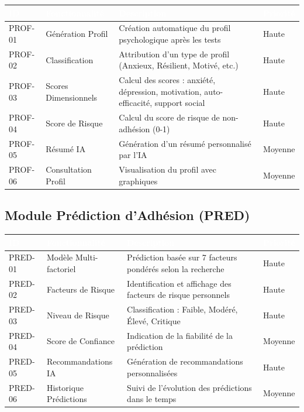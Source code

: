 \documentclass[12pt,a4paper]{report}
\begin{document}
\begin{longtable}{|p{2cm}|p{4cm}|p{7cm}|p{1.5cm}|}
    \hline
    \rowcolor{emsiblue}\textcolor{white}{\textbf{ID}} & \textcolor{white}{\textbf{Fonctionnalité}} & \textcolor{white}{\textbf{Description}} & \textcolor{white}{\textbf{Priorité}} \\
    \hline
    
    PROF-01 & Génération Profil & Création automatique du profil psychologique après les tests & Haute \\
    \hline
    PROF-02 & Classification & Attribution d'un type de profil (Anxieux, Résilient, Motivé, etc.) & Haute \\
    \hline
    PROF-03 & Scores Dimensionnels & Calcul des scores : anxiété, dépression, motivation, auto-efficacité, support social & Haute \\
    \hline
    PROF-04 & Score de Risque & Calcul du score de risque de non-adhésion (0-1) & Haute \\
    \hline
    PROF-05 & Résumé IA & Génération d'un résumé personnalisé par l'IA & Moyenne \\
    \hline
    PROF-06 & Consultation Profil & Visualisation du profil avec graphiques & Moyenne \\
    \hline
\end{longtable}

\subsection{Module Prédiction d'Adhésion (PRED)}

\begin{longtable}{|p{2cm}|p{4cm}|p{7cm}|p{1.5cm}|}
    \hline
    \rowcolor{emsiblue}\textcolor{white}{\textbf{ID}} & \textcolor{white}{\textbf{Fonctionnalité}} & \textcolor{white}{\textbf{Description}} & \textcolor{white}{\textbf{Priorité}} \\
    \hline
    
    PRED-01 & Modèle Multi-factoriel & Prédiction basée sur 7 facteurs pondérés selon la recherche & Haute \\
    \hline
    PRED-02 & Facteurs de Risque & Identification et affichage des facteurs de risque personnels & Haute \\
    \hline
    PRED-03 & Niveau de Risque & Classification : Faible, Modéré, Élevé, Critique & Haute \\
    \hline
    PRED-04 & Score de Confiance & Indication de la fiabilité de la prédiction & Moyenne \\
    \hline
    PRED-05 & Recommandations IA & Génération de recommandations personnalisées & Haute \\
    \hline
    PRED-06 & Historique Prédictions & Suivi de l'évolution des prédictions dans le temps & Moyenne \\
    \hline
\end{longtable}
\end{document}
